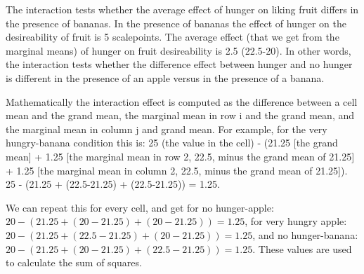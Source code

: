 \documentclass[]{book}
\begin{document}
The interaction tests whether the average effect of hunger on liking fruit differs in the presence of bananas. In the presence of bananas the effect of hunger on the desireability of fruit is 5 scalepoints. The average effect (that we get from the marginal means) of hunger on fruit desireability is 2.5 (22.5-20). In other words, the interaction tests whether the difference effect between hunger and no hunger is different in the presence of an apple versus in the presence of a banana.

Mathematically the interaction effect is computed as the difference between a cell mean and the grand mean, the marginal mean in row i and the grand mean, and the marginal mean in column j and grand mean. For example, for the very hungry-banana condition this is: 25 (the value in the cell) - (21.25 {[}the grand mean{]} + 1.25 {[}the marginal mean in row 2, 22.5, minus the grand mean of 21.25{]} + 1.25 {[}the marginal mean in column 2, 22.5, minus the grand mean of 21.25{]}). 25 - (21.25 + (22.5-21.25) + (22.5-21.25)) = 1.25.

We can repeat this for every cell, and get for no hunger-apple: \(20 - (21.25 + (20-21.25) + (20-21.25)) = 1.25\), for very hungry apple: \(20 - (21.25 + (22.5-21.25) + (20-21.25)) = 1.25\), and no hunger-banana: \(20 - (21.25 + (20-21.25) + (22.5-21.25)) = 1.25\). These values are used to calculate the sum of squares.
\end{document}
